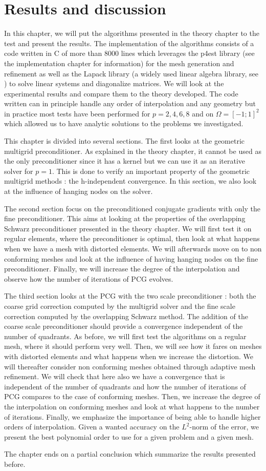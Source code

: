 \chapter{Results and discussion}
In this chapter, we will put the algorithms presented in the theory chapter to the test and present the results. The implementation of the algorithms consists of a code written in C of more than 8000 lines which leverages the p4est library (see the implementation chapter for information) for the mesh generation and refinement as well as the Lapack library (a widely used linear algebra library, see \cite{lapack}) to solve linear systems and diagonalize matrices. We will look at the experimental results and compare them to the theory developed. The code written can in principle handle any order of interpolation and any geometry but in practice most tests have been performed for $p=2,4,6,8$ and on $\Omega = [-1;1]^2$ which allowed us to have analytic solutions to the problems we investigated. 

This chapter is divided into several sections. The first looks at the geometric multigrid preconditioner. As explained in the theory chapter, it cannot be used as the only preconditioner since it has a kernel but we can use it as an iterative solver for $p=1$. This is done to verify an important property of the geometric multigrid methods : the h-independent convergence. In this section, we also look at the influence of hanging nodes on the solver.

The second section focus on the preconditioned conjugate gradients with only the fine preconditioner. This aims at looking at the properties of the overlapping Schwarz preconditioner presented in the theory chapter. We will first test it on regular elements, where the preconditioner is optimal, then look at what happens when we have a mesh with distorted elements. We will afterwards move on to non conforming meshes and look at the influence of having hanging nodes on the fine preconditioner. Finally, we will increase the degree of the interpolation and observe how the number of iterations of PCG evolves. 

The third section looks at the PCG with the two scale preconditioner : both the coarse grid correction computed by the multigrid solver and the fine scale correction computed by the overlapping Schwarz method. The addition of the coarse scale preconditioner should provide a convergence independent of the number of quadrants. As before, we will first test the algorithms on a regular mesh, where it should perform very well. Then, we will see how it fares on meshes with distorted elements and what happens when we increase the distortion. We will thereafter consider non conforming meshes obtained through adaptive mesh refinement. We will check that here also we have a convergence that is independent of the number of quadrants and how the number of iterations of PCG compares to the case of conforming meshes. Then, we increase the degree of the interpolation on conforming meshes and look at what happens to the number of iterations. Finally, we emphasize the importance of being able to handle higher orders of interpolation. Given a wanted accuracy on the $L^2$-norm of the error, we present the best polynomial order to use for a given problem and a given mesh. 

The chapter ends on a partial conclusion which summarize the results presented before.

  